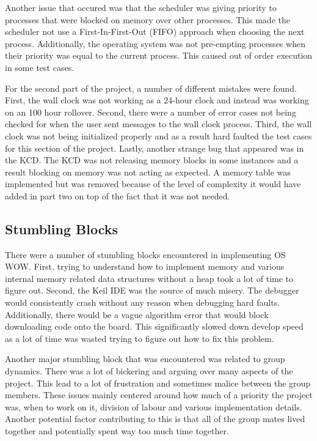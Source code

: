 \documentclass[se]{uw-wkrpt}
\begin{document}
Another issue that occured was that the scheduler was giving priority to processes that were blocked on memory over other processes. This made the scheduler not use a First-In-First-Out (FIFO) approach when choosing the next process. Additionally, the operating system was not pre-empting processes when their priority was equal to the current process. This caused out of order execution in some test cases.

For the second part of the project, a number of different mistakes were found. First, the wall clock was not working as a 24-hour clock and instead was working on an 100 hour rollover. Second, there were a number of error cases not being checked for when the user sent messages to the wall clock process. Third, the wall clock was not being initialized properly and as a result hard faulted the test cases for this section of the project. Lastly, another strange bug that appeared was in the KCD. The KCD was not releasing memory blocks in some instances and a result blocking on memory was not acting as expected. A memory table was implemented but was removed because of the level of complexity it would have added in part two on top of the fact that it was not needed.

\subsection{Stumbling Blocks}

There were a number of stumbling blocks encountered in implementing OS WOW. First, trying to understand how to implement memory and various internal memory related data structures without a heap took a lot of time to figure out. Second, the Keil IDE was the source of much misery. The debugger would consistently crash without any reason when debugging hard faults. Additionally, there would be a vague algorithm error that would block downloading code onto the board. This significantly slowed down develop speed as a lot of time was wasted trying to figure out how to fix this problem. 

Another major stumbling block that was encountered was related to group dynamics. There was a lot of bickering and arguing over many aspects of the project. This lead to a lot of frustration and sometimes malice between the group members. These issues mainly centered around how much of a priority the project was, when to work on it, division of labour and various implementation details. Another potential factor contributing to this is that all of the group mates lived together and potentially spent way too much time together.
\end{document}
